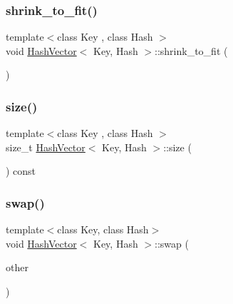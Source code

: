 \mbox{\label{class_hash_vector_aa21f1dca09001c02ac4ed5090d137b43}} 
\subsubsection{\texorpdfstring{shrink\+\_\+to\+\_\+fit()}{shrink\_to\_fit()}}
{\footnotesize\ttfamily template$<$class Key , class Hash $>$ \\
void \mbox{\hyperlink{class_hash_vector}{Hash\+Vector}}$<$ Key, Hash $>$\+::shrink\+\_\+to\+\_\+fit (\begin{DoxyParamCaption}{ }\end{DoxyParamCaption})}

\mbox{\label{class_hash_vector_a13a560f124221dce8944f21ec88600f9}} 
\subsubsection{\texorpdfstring{size()}{size()}}
{\footnotesize\ttfamily template$<$class Key , class Hash $>$ \\
size\+\_\+t \mbox{\hyperlink{class_hash_vector}{Hash\+Vector}}$<$ Key, Hash $>$\+::size (\begin{DoxyParamCaption}{ }\end{DoxyParamCaption}) const}

\mbox{\label{class_hash_vector_a1b1083a530fe2420b309e921a9467b33}} 
\subsubsection{\texorpdfstring{swap()}{swap()}}
{\footnotesize\ttfamily template$<$class Key, class Hash$>$ \\
void \mbox{\hyperlink{class_hash_vector}{Hash\+Vector}}$<$ Key, Hash $>$\+::swap (\begin{DoxyParamCaption}\item[{\mbox{\hyperlink{class_hash_vector}{Hash\+Vector}}$<$ Key, Hash $>$ \&}]{other }\end{DoxyParamCaption})}

